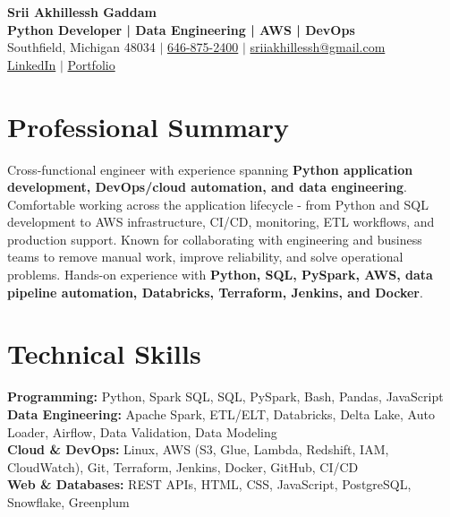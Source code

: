 \documentclass[letterpaper,10pt]{article}
\begin{document}
\fontsize{9.35pt}{10.45pt}\selectfont

\begin{center}
    {\LARGE \textbf{Srii Akhillessh Gaddam}} \\[-1pt]
    \textbf{Python Developer | Data Engineering | AWS | DevOps} \\[2pt]
    Southfield, Michigan 48034 $|$
    \href{tel:6468752400}{646-875-2400} $|$
    \href{mailto:sriiakhillessh@gmail.com}{sriiakhillessh@gmail.com} \\[1pt]
    \href{https://www.linkedin.com/in/srii-akhiilessh-gaddam-b48668191/}{LinkedIn} $|$
    \href{https://sriiakhillesshg.github.io/portfolio/}{Portfolio}
\end{center}
\vspace{-8pt}

\section{Professional Summary}
\small{Cross-functional engineer with experience spanning \textbf{Python application development, DevOps/cloud automation, and data engineering}. Comfortable working across the application lifecycle - from Python and SQL development to AWS infrastructure, CI/CD, monitoring, ETL workflows, and production support. Known for collaborating with engineering and business teams to remove manual work, improve reliability, and solve operational problems. Hands-on experience with \textbf{Python, SQL, PySpark, AWS, data pipeline automation, Databricks, Terraform, Jenkins, and Docker}.}

\section{Technical Skills}
\small{
\textbf{Programming:} Python, Spark SQL, SQL, PySpark, Bash, Pandas, JavaScript \\
\textbf{Data Engineering:} Apache Spark, ETL/ELT, Databricks, Delta Lake, Auto Loader, Airflow, Data Validation, Data Modeling \\
\textbf{Cloud \& DevOps:} Linux, AWS (S3, Glue, Lambda, Redshift, IAM, CloudWatch), Git, Terraform, Jenkins, Docker, GitHub, CI/CD \\
\textbf{Web \& Databases:} REST APIs, HTML, CSS, JavaScript, PostgreSQL, Snowflake, Greenplum
}
\end{document}
